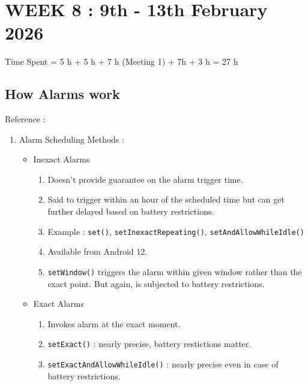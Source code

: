 \documentclass{article}
\begin{document}
\newpage
\section{WEEK 8 : 9th - 13th February 2026}
Time Spent = 5 h + 5 h + 7 h (Meeting 1) + 7h + 3 h = 27 h
\subsection{How Alarms work}
Reference : 
\begin{enumerate}
    \item Alarm Scheduling Methods :
    \begin{itemize}
        \item Inexact Alarms
        \begin{enumerate}
            \item Doesn't provide guarantee on the alarm trigger time.
            \item Said to trigger within an hour of the scheduled time but can get further delayed based on battery restrictions.
            \item Example : \texttt{set()}, \texttt{setInexactRepeating()}, \texttt{setAndAllowWhileIdle()}
            \item Available from Android 12.
            \item \texttt{setWindow()} triggers the alarm within given window rather than the exact point. But again, is subjected to battery restrictions.
        \end{enumerate}
        \item Exact Alarms
        \begin{enumerate}
            \item Invokes alarm at the exact moment.
            \item \texttt{setExact()} : nearly precise, battery restictions matter.
            \item \texttt{setExactAndAllowWhileIdle()} : nearly precise even in case of battery restrictions.
        \end{enumerate}
    \end{itemize}
\end{enumerate}
\end{document}
